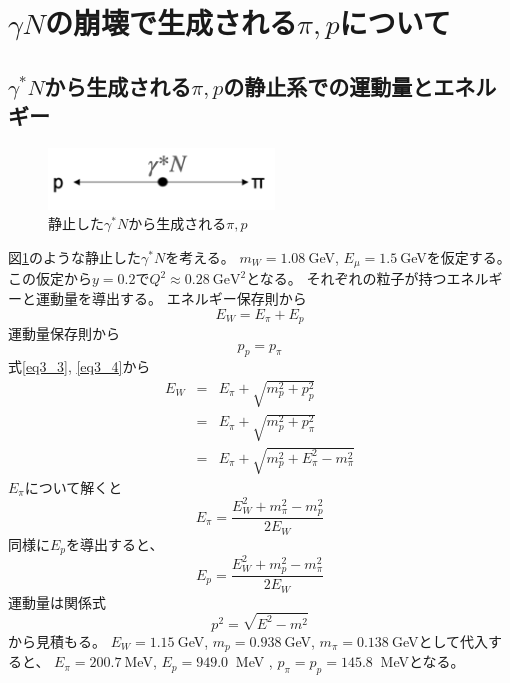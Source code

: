 \section{\texorpdfstring{$\gamma N$の崩壊で生成される$\pi, p$について}{LG}}
\subsection{$\gamma^* N$から生成される$\pi,p$の静止系での運動量とエネルギー}
\begin{figure}[H]
    \centering
    \includegraphics[width=6cm]{img/rest_middle_situation.png}
    \caption{静止した$\gamma^* N$から生成される$\pi,p$}
    \label{fig:angle5}
\end{figure}
図\ref{fig:angle5}のような静止した$\gamma^* N$を考える。
$m_W = 1.08 \ $GeV, $E_\mu = 1.5 \ $GeVを仮定する。
この仮定から$y = 0.2$で$Q^2 \approx 0.28 \ \mathrm{GeV^2}$となる。
それぞれの粒子が持つエネルギーと運動量を導出する。
エネルギー保存則から
\begin{equation}
    \label{eq3_3}
    E_W = E_\pi + E_p
\end{equation}
運動量保存則から
\begin{equation}
    \label{eq3_4}
    p_p = p_\pi
\end{equation}
式\ref{eq3_3}, \ref{eq3_4}から
\begin{eqnarray}
    E_W  & =  & E_\pi + \sqrt{m_p^2 + p_p^2} \\
    & = & E_\pi + \sqrt{m_p^2 + p_\pi^2} \\
    & = & E_\pi + \sqrt{m_p^2 + E_\pi^2 - m_\pi^2}
\end{eqnarray}
$E_\pi$について解くと
\begin{equation}
    E_\pi = \dfrac{E_W ^2 + m_\pi ^2 - m_p ^2}{2E_W}
\end{equation}
同様に$E_p$を導出すると、
\begin{equation}
    E_p = \dfrac{E_W ^2 + m_p ^2 - m_\pi ^2}{2E_W}
\end{equation}
運動量は関係式
\begin{equation}
    p^2 = \sqrt{E^2 - m^2}
\end{equation}
から見積もる。
$E_W = 1.15 \ $GeV, $m_p = 0.938 \ $GeV, $m_\pi = 0.138 \ $GeVとして代入すると、
$E_π = 200.7 \ $MeV, $E_p = 949.0 \ $ MeV , $p_π = p_p = 145.8 \ $ MeVとなる。

